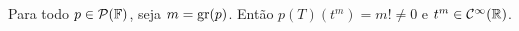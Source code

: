 \documentclass[../main.tex]{subfiles}
\begin{document}
Para todo \(p\in\mathcal{P}(\mathbb{F})\), seja \(m=\operatorname{gr}(p)\). Então
\(p(T)(t^m)=m!\neq 0\) e \(t^m\in\mathcal{C}^\infty(\mathbb{R})\).
\end{document}
